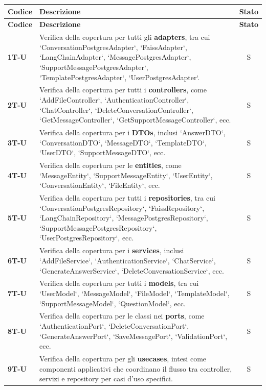 \documentclass{article}
\begin{document}
\begin{longtable}{|>{\centering\arraybackslash}m{}|>{\raggedright\arraybackslash}m{}|c|}
    \hline
    \textbf{Codice} & \textbf{Descrizione} & \textbf{Stato} \\
    \hline
    \endfirsthead
    \hline
    \textbf{Codice} & \textbf{Descrizione} & \textbf{Stato} \\
    \hline
    \endhead
    \hline
    \endfoot

    \textbf{1T-U} & Verifica della copertura per tutti gli \textbf{adapters}, tra cui `ConversationPostgresAdapter`, `FaissAdapter`, `LangChainAdapter`, `MessagePostgresAdapter`, `SupportMessagePostgresAdapter`, `TemplatePostgresAdapter`, `UserPostgresAdapter`. & S \\
    \hline
    \textbf{2T-U} & Verifica della copertura per tutti i \textbf{controllers}, come `AddFileController`, `AuthenticationController`, `ChatController`, `DeleteConversationController`, `GetMessageController`, `GetSupportMessageController`, ecc. & S \\
    \hline
    \textbf{3T-U} & Verifica della copertura per i \textbf{DTOs}, inclusi `AnswerDTO`, `ConversationDTO`, `MessageDTO`, `TemplateDTO`, `UserDTO`, `SupportMessageDTO`, ecc. & S \\
    \hline
    \textbf{4T-U} & Verifica della copertura per le \textbf{entities}, come `MessageEntity`, `SupportMessageEntity`, `UserEntity`, `ConversationEntity`, `FileEntity`, ecc. & S \\
    \hline
    \textbf{5T-U} & Verifica della copertura per tutti i \textbf{repositories}, tra cui `ConversationPostgresRepository`, `FaissRepository`, `LangChainRepository`, `MessagePostgresRepository`, `SupportMessagePostgresRepository`, `UserPostgresRepository`, ecc. & S \\
    \hline
    \textbf{6T-U} & Verifica della copertura per i \textbf{services}, inclusi `AddFileService`, `AuthenticationService`, `ChatService`, `GenerateAnswerService`, `DeleteConversationService`, ecc. & S \\
    \hline
    \textbf{7T-U} & Verifica della copertura per tutti i \textbf{models}, tra cui `UserModel`, `MessageModel`, `FileModel`, `TemplateModel`, `SupportMessageModel`, `QuestionModel`, ecc. & S \\
    \hline
    \textbf{8T-U} & Verifica della copertura per le classi nei \textbf{ports}, come `AuthenticationPort`, `DeleteConversationPort`, `GenerateAnswerPort`, `SaveMessagePort`, `ValidationPort`, ecc. & S \\
    \hline
    \textbf{9T-U} & Verifica della copertura per gli \textbf{usecases}, intesi come componenti applicativi che coordinano il flusso tra controller, servizi e repository per casi d’uso specifici. & S \\
    \hline
\end{longtable}
\end{document}
